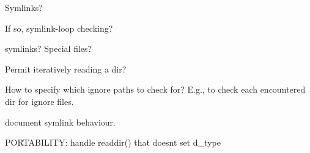 \begin{DoxyRefList}
\begin{DoxyItemize}
\item Symlinks?
\item If so, symlink-\/loop checking?  
\end{DoxyItemize}
\item[Member \mbox{\hyperlink{classsmallcxx_1_1GlobstariBase_a88fb168fe7119f9db5484a6aacafff28}{smallcxx::Globstari\+Base::Entry\+Type}} ]\label{todo__todo000002}%
%
symlinks? Special files?  
\item[Member \mbox{\hyperlink{classsmallcxx_1_1GlobstariBase_acfacd1b48c26cd6b0844ca691e289f88}{smallcxx::Globstari\+Base::read\+Dir}} (const \mbox{\hyperlink{namespacesmallcxx_1_1glob_ab5bbdf6a29a29b34e4d70d02c5097d9d}{smallcxx\+::glob\+::\+Path}} \&dir\+Name)=0]\label{todo__todo000003}%
%
Permit iteratively reading a dir?  
\item[Member \mbox{\hyperlink{classsmallcxx_1_1GlobstariBase_ad46fdf7308310682be53968f55b9a822}{smallcxx::Globstari\+Base::traverse}} (const \mbox{\hyperlink{namespacesmallcxx_1_1glob_ab5bbdf6a29a29b34e4d70d02c5097d9d}{smallcxx\+::glob\+::\+Path}} \&base\+Path, const std\+::vector$<$ smallcxx\+::glob\+::\+Path $>$ \&needle, ssize\+\_\+t max\+Depth=-\/1)]\label{todo__todo000004}%
%
How to specify which ignore paths to check for? E.\+g., to check each encountered dir for ignore files.  
\item[Member \mbox{\hyperlink{classsmallcxx_1_1GlobstariDisk_adb41ab28dff5fdc1bcd700adb30de4c2}{smallcxx::Globstari\+Disk::canonicalize}} (const \mbox{\hyperlink{namespacesmallcxx_1_1glob_ab5bbdf6a29a29b34e4d70d02c5097d9d}{smallcxx\+::glob\+::\+Path}} \&path) const override]\label{todo__todo000012}%
%
document symlink behaviour. 
\item[Member \mbox{\hyperlink{classsmallcxx_1_1GlobstariDisk_accf21bcc460f4a05b831c4e48fd25831}{smallcxx::Globstari\+Disk::read\+Dir}} (const \mbox{\hyperlink{namespacesmallcxx_1_1glob_ab5bbdf6a29a29b34e4d70d02c5097d9d}{smallcxx\+::glob\+::\+Path}} \&dir\+Name) override]\label{todo__todo000010}%
%
P\+O\+R\+T\+A\+B\+I\+L\+I\+TY\+: handle readdir() that doesn\textquotesingle{}t set d\+\_\+type  
\item[Member \mbox{\hyperlink{classsmallcxx_1_1GlobstariDisk_af6ed1d7b3a5fae9e15d6790d9ac00446}{smallcxx::Globstari\+Disk::read\+File}} (const \mbox{\hyperlink{namespacesmallcxx_1_1glob_ab5bbdf6a29a29b34e4d70d02c5097d9d}{smallcxx\+::glob\+::\+Path}} \&path) override]\label{todo__todo000011}%

\end{DoxyRefList}
